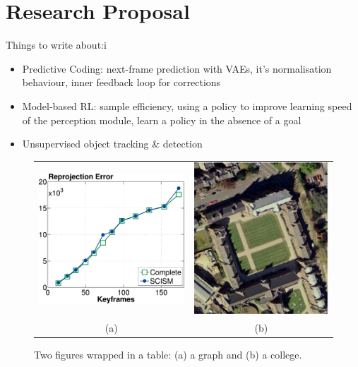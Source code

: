 \section{Research Proposal}
\label{sec:proposal}

Things to write about:i
\begin{itemize}
	\item Predictive Coding: next-frame prediction with VAEs, it's normalisation behaviour, inner feedback loop for corrections
	\item Model-based RL: sample efficiency, using a policy to improve learning speed of the perception module, learn a policy in the absence of a goal
	\item Unsupervised object tracking \& detection
\end{itemize}


\begin{figure}
\centering
\begin{tabular}{cc}     
 \includegraphics[height=0.42\columnwidth]{Figs/fig01.pdf} &
 \includegraphics[height=0.40\columnwidth]{Figs/fig02.pdf} \\
 (a) & (b)
\end{tabular}
\caption{Two figures wrapped in a table: (a) a graph and (b) a college.}
\label{fig:myfirstfigure}
\end{figure}